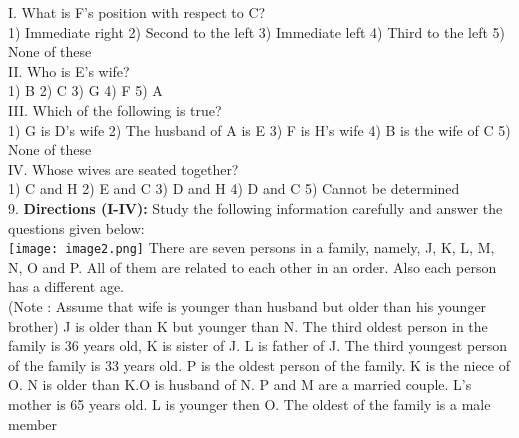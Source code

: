 \documentclass[
]{article}
\begin{document}
I. What is F’s position with respect to C?\\
1) Immediate right \hspace{2mm}2) Second to the left \hspace{2mm}3) Immediate left
\hspace{2mm}4) Third to the left \hspace{2mm}5) None of these\\

II. Who is E's wife?\\
1) B \hspace{2mm}2) C \hspace{2mm}3) G \hspace{2mm}4) F \hspace{2mm}5) A\\

III. Which of the following is true?\\
1) G is D's wife \hspace{2mm}2) The husband of A is E \hspace{2mm}3) F is H's wife
\hspace{2mm}4) B is the wife of C \hspace{2mm}5) None of these\\

IV. Whose wives are seated together?\\
1) C and H \hspace{2mm}2) E and C \hspace{2mm}3) D and H
\hspace{2mm}4) D and C \hspace{2mm}5) Cannot be determined\\

9. \textbf{Directions (I-IV):} Study the following information carefully and answer the questions given
below:\\
\texttt{[image: image2.png]}
There are seven persons in a family, namely, J, K, L, M, N, O and P. All of them are related
to each other in an order. Also each person has a different age.\\
(Note : Assume that wife is younger than husband but older than his younger brother)
J is older than K but younger than N. The third oldest person in the family is 36 years old, K
is sister of J. L is father of J. The third youngest person of the family is 33 years old. P is the
oldest person of the family. K is the niece of O. N is older than K.O is husband of N. P and
M are a married couple. L’s mother is 65 years old. L is younger then O. The oldest of the
family is a male member\\
\end{document}

